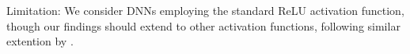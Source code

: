 Limitation: We consider DNNs employing the standard ReLU activation function, though our findings should extend to other activation functions, following similar extention by \cite{DivideAndSlide}. 




%   
% 
%
%
%
%
